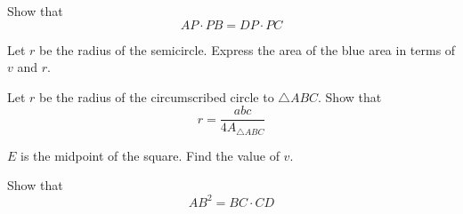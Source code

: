 Show that 
\[ AP\cdot PB = DP\cdot PC \]

\newpage
{}
Let $ r $ be the radius of the semicircle. Express the area of the blue area in terms of $ v $ and $ r $.

Let $ r $ be the radius of the circumscribed circle to $ \triangle ABC $. Show that
\[ r=\frac{abc}{4A_{\triangle ABC}} \]

$ E $ is the midpoint of the square. Find the value of $ v $.

\newpage
{}
Show that
\[ AB^2 = BC\cdot CD \]






